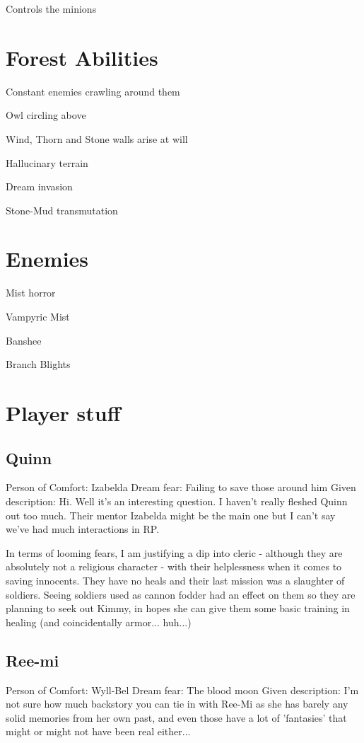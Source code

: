 \documentclass{article}
\begin{document}
    Controls the minions

    \section{Forest Abilities}

    Constant enemies crawling around them

    Owl circling above

    Wind, Thorn and Stone walls arise at will

    Hallucinary terrain

    Dream invasion

    Stone-Mud transmutation

    \section{Enemies}

    Mist horror

    Vampyric Mist

    Banshee

    Branch Blights

    \section{Player stuff}

    \subsection{Quinn}
    Person of Comfort:
        Izabelda
    Dream fear:
        Failing to save those around him
    Given description:
        Hi. Well it's an interesting question. I haven't really fleshed Quinn out too much. Their mentor Izabelda might be the main one but I can't say we've had much interactions in RP.

        In terms of looming fears, I am justifying a dip into cleric - although they are absolutely not a religious character - with their helplessness when it comes to saving innocents. 
        They have no heals and their last mission was a slaughter of soldiers. Seeing soldiers used as cannon fodder had an effect on them so they are planning to seek out Kimmy, 
        in hopes she can give them some basic training in healing (and coincidentally armor... huh...)
    \subsection{Ree-mi}
    Person of Comfort:
        Wyll-Bel
    Dream fear:
        The blood moon
    Given description:
        I'm not sure how much backstory you can tie in with Ree-Mi as she has barely any solid memories from her own past, and even those have a lot of 'fantasies' that might or might not have been real either...
\end{document}
